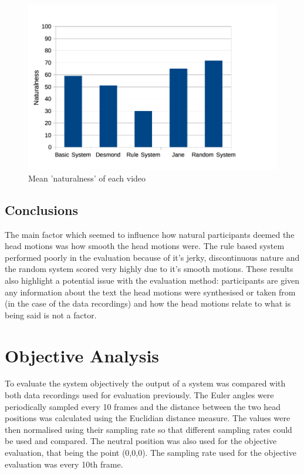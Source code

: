 \documentclass[bsc,frontabs,twoside,singlespacing,parskip]{infthesis}
\begin{document}
\begin{figure}
	\centering
	\includegraphics[width=1.0\textwidth]{chart.png}
	\caption{Mean 'naturalness' of each video}
\end{figure}

\subsection{Conclusions}

The main factor which seemed to influence how natural participants deemed the head motions was how smooth the head motions were. The rule based system performed poorly in the evaluation because of it's jerky, discontinuous nature and the random system scored very highly due to it's smooth motions. These results also highlight a potential issue with the evaluation method: participants are given any information about the text the head motions were synthesised or taken from (in the case of the data recordings) and how the head motions relate to what is being said is not a factor. 


\section{Objective Analysis}

To evaluate the system objectively the output of a system was compared with both data recordings used for evaluation previously. The Euler angles were periodically sampled every 10 frames and the distance between the two head positions was calculated using the Euclidian distance measure. The values were then normalised using their sampling rate so that different sampling rates could be used and compared. The neutral position was also used for the objective evaluation, that being the point (0,0,0). The sampling rate used for the objective evaluation was every 10th frame. 
\end{document}
